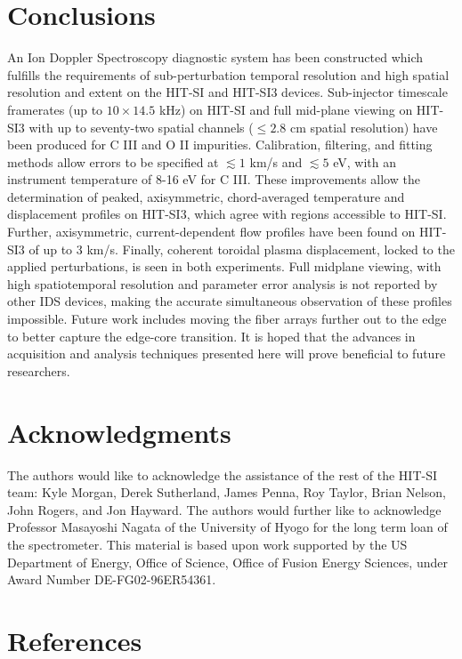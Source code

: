 	\section{Conclusions}
	\hspace{4ex}An Ion Doppler Spectroscopy diagnostic system has been constructed which fulfills the requirements of sub-perturbation temporal resolution and high spatial resolution and extent on the HIT-SI and HIT-SI3 devices. Sub-injector timescale framerates (up to $10\times{14.5}$ kHz) on HIT-SI and full mid-plane viewing on HIT-SI3 with up to seventy-two spatial channels ($\leq2.8$ cm spatial resolution) have been produced for C III and O II impurities. Calibration, filtering, and fitting methods allow errors to be specified at $\lesssim1$ km/s and $\lesssim5$ eV, with an instrument temperature of 8-16 eV for C III. These improvements allow the determination of peaked, axisymmetric, chord-averaged temperature and displacement profiles on HIT-SI3, which agree with regions accessible to HIT-SI. Further, axisymmetric, current-dependent flow profiles have been found on HIT-SI3 of up to 3 km/s. Finally, coherent toroidal plasma displacement, locked to the applied perturbations, is seen in both experiments. Full midplane viewing, with high spatiotemporal resolution and parameter error analysis is not reported by other IDS devices, making the accurate simultaneous observation of these profiles impossible. Future work includes moving the fiber arrays further out to the edge to better capture the edge-core transition. It is hoped that the advances in acquisition and analysis techniques presented here will prove beneficial to future researchers. 
	
	
	\section{Acknowledgments}
	The authors would like to acknowledge the assistance of the rest of the HIT-SI team: Kyle Morgan, Derek Sutherland, James Penna, Roy Taylor, Brian Nelson, John Rogers, and Jon Hayward. The authors would further like to acknowledge Professor Masayoshi Nagata of the University of Hyogo for the long term loan of the spectrometer. This material is based upon work supported by the US Department of Energy, Office of Science, Office of Fusion Energy Sciences, under Award Number DE-FG02-96ER54361.
	
	
	\section{References}
	
	
	
	

	

